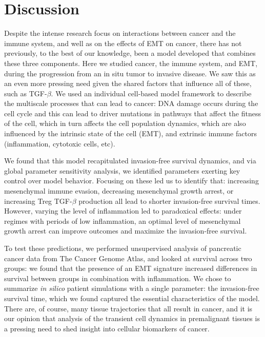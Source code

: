 \documentclass[11pt]{article}
\begin{document}
\section{Discussion}\label{Discussion}
Despite the intense research focus on interactions between cancer and the immune system, and well as on the effects of EMT on cancer, there has not previously, to the best of our knowledge, been a model developed that combines these three components. Here we studied cancer, the immune system, and EMT, during the progression from an in situ tumor to invasive disease. We saw this as an even more pressing need given the shared factors that influence all of these, such as TGF-$\beta$. We used an individual cell-based model framework to describe the multiscale processes that can lead to cancer: DNA damage occurs during the cell cycle and this can lead to driver mutations in pathways that affect the fitness of the cell, which in turn affects the cell population dynamics, which are also influenced by the intrinsic state of the cell (EMT), and extrinsic immune factors (inflammation, cytotoxic cells, etc).
\par
We found that this model recapitulated invasion-free survival dynamics, and via global parameter sensitivity analysis, we identified parameters exerting key control over model behavior. Focusing on these led us to identify that: increasing mesenchymal immune evasion, decreasing mesenchymal growth arrest, or increasing Treg TGF-$\beta$ production all lead to shorter invasion-free survival times. However, varying the level of inflammation led to paradoxical effects: under regimes with periods of low inflammation, an optimal level of mesenchymal growth arrest can improve outcomes and maximize the invasion-free survival.
\par
To test these predictions, we performed unsupervised analysis of pancreatic cancer data from The Cancer Genome Atlas, and looked at survival across two groups: we found that the presence of an EMT signature increased differences in survival between groups in combination with inflammation. We chose to summarize {\em in silico} patient simulations with a single parameter: the invasion-free survival time, which we found captured the essential characteristics of the model. There are, of course, many tissue trajectories that all result in cancer, and it is our opinion that analysis of the transient cell dynamics in premalignant tissues is a pressing need to shed insight into cellular biomarkers of cancer.
\par
\end{document}
